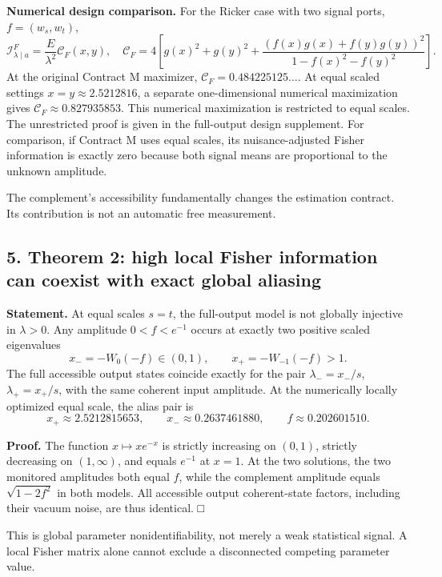 \documentclass[
  10pt,
  a4paper,
]{article}
\begin{document}
\textbf{Numerical design comparison.} For the Ricker case with two signal ports, \(f=(w_s,w_t)\), \[
 \mathcal I^F_{\lambda\mid a}=\frac E{\lambda^2}\mathcal C_F(x,y),
\quad
\mathcal C_F=4\left[g(x)^2+g(y)^2+\frac{(f(x)g(x)+f(y)g(y))^2}{1-f(x)^2-f(y)^2}\right].
\] At the original Contract M maximizer, \(\mathcal C_F=0.484225125\ldots\). At equal scaled settings \(x=y\approx2.5212816\), a separate one-dimensional numerical maximization gives \(\mathcal C_F\approx0.827935853\). This numerical maximization is restricted to equal scales. The unrestricted proof is given in the full-output design supplement. For comparison, if Contract M uses equal scales, its nuisance-adjusted Fisher information is exactly zero because both signal means are proportional to the unknown amplitude.

The complement's accessibility fundamentally changes the estimation contract. Its contribution is not an automatic free measurement.

\subsection{5. Theorem 2: high local Fisher information can coexist with exact global aliasing}\label{theorem-2-high-local-fisher-information-can-coexist-with-exact-global-aliasing}

\textbf{Statement.} At equal scales \(s=t\), the full-output model is not globally injective in \(\lambda>0\). Any amplitude \(0<f<e^{-1}\) occurs at exactly two positive scaled eigenvalues \[
 x_-=-W_0(-f)\in(0,1),\qquad x_+=-W_{-1}(-f)>1.
\] The full accessible output states coincide exactly for the pair \(\lambda_-=x_-/s\), \(\lambda_+=x_+/s\), with the same coherent input amplitude. At the numerically locally optimized equal scale, the alias pair is \[
 x_+\approx2.5212815653,\qquad x_-\approx0.2637461880,
\qquad f\approx0.202601510.
\]

\textbf{Proof.} The function \(x\mapsto xe^{-x}\) is strictly increasing on \((0,1)\), strictly decreasing on \((1,\infty)\), and equals \(e^{-1}\) at \(x=1\). At the two solutions, the two monitored amplitudes both equal \(f\), while the complement amplitude equals \(\sqrt{1-2f^2}\) in both models. All accessible output coherent-state factors, including their vacuum noise, are thus identical. □

This is global parameter nonidentifiability, not merely a weak statistical signal. A local Fisher matrix alone cannot exclude a disconnected competing parameter value.
\end{document}
